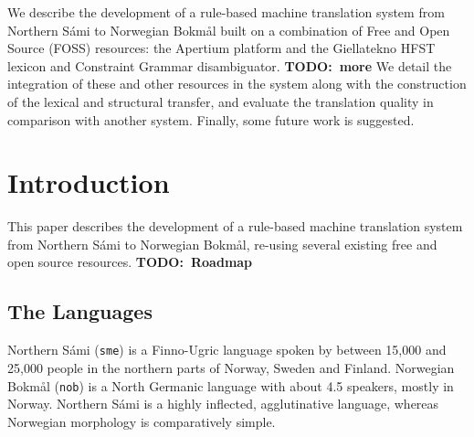 \newcommand{\comment}[1]{\textbf{TODO:~#1}}


\newcommand{\href}[2]{{\tt #1}} %

\newcommand{\sme}{{\tt sme}}
\newcommand{\nob}{{\tt nob}}
\newcommand{\smenob}{\sme$\rightarrow{}$\nob}
\newcommand{\nobsme}{\nob$\rightarrow{}$\sme}






  
    We describe the development of a rule-based machine translation
    system from Northern Sámi to Norwegian Bokmål built on a
    combination of Free and Open Source (FOSS) resources: the Apertium
    platform and the Giellatekno HFST lexicon and Constraint Grammar
    disambiguator.
    \comment{more}
    We detail the integration of these and other resources in the
    system along with the construction of the lexical and structural
    transfer, and evaluate the translation quality in comparison with
    another system. Finally, some future work is suggested.




\section{Introduction}
This paper describes the development of a rule-based machine
translation system from Northern Sámi to Norwegian Bokmål, re-using
several existing free and open source resources. \comment{Roadmap}

\subsection{The Languages}
Northern Sámi (\sme{}) is a Finno-Ugric language spoken by between
15,000 and 25,000 people in the northern parts of Norway, Sweden and
Finland. Norwegian Bokmål (\nob{}) is a North Germanic language with
about 4.5 speakers, mostly in Norway. Northern Sámi is a highly
inflected, agglutinative language, whereas Norwegian morphology is
comparatively simple.

